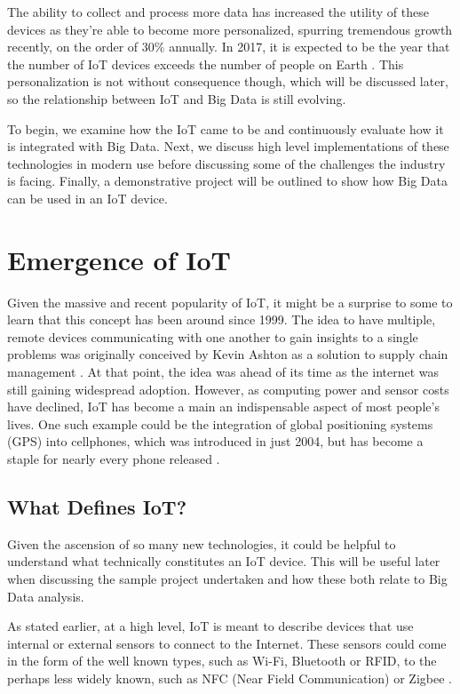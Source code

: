 \documentclass[sigconf]{acmart}
\begin{document}
The ability to collect and process more data has increased the utility of these devices as they're able to become more personalized, spurring tremendous growth recently, on the order of $30 \%$ annually. In 2017, it is expected to be the year that the number of IoT devices exceeds the number of people on Earth \cite{gartnerconnected}. This personalization is not without consequence though, which will be discussed later, so the relationship between IoT and Big Data is still evolving. 

To begin, we examine how the IoT came to be and continuously evaluate how it is integrated with Big Data. Next, we discuss high level implementations of these technologies in modern use before discussing some of the challenges the industry is facing. Finally, a demonstrative project will be outlined to show how Big Data can be used in an IoT device. 

\section{Emergence of IoT}
Given the massive and recent popularity of IoT, it might be a surprise to some to learn that this concept has been around since 1999. The idea to have multiple, remote devices communicating with one another to gain insights to a single problems was originally conceived by Kevin Ashton as a solution to supply chain management \cite{ashton}. At that point, the idea was ahead of its time as the internet was still gaining widespread adoption. However, as computing power and sensor costs have declined, IoT has become a main an indispensable aspect of most people's lives. One such example could be the integration of global positioning systems (GPS) into cellphones, which was introduced in just 2004, but has become a staple for nearly every phone released \cite{gps}.  
\subsection{What Defines IoT?}
Given the ascension of so many new technologies, it could be helpful to understand what technically constitutes an IoT device. This will be useful later when discussing the sample project undertaken and how these both relate to Big Data analysis. 

As stated earlier, at a high level, IoT is meant to describe devices that use internal or external sensors to connect to the Internet. These sensors could come in the form of the well known types, such as Wi-Fi, Bluetooth or RFID, to the perhaps less widely known, such as NFC (Near Field Communication) or Zigbee \cite{lopez}.
\end{document}
